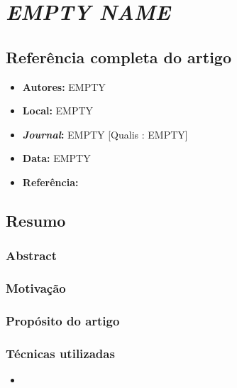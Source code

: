 \section{\textit{EMPTY NAME}}

\subsection{Referência completa do artigo}

\begin{itemize}
  \item \textbf{Autores:} EMPTY
  \item \textbf{Local:} EMPTY
  \item \textbf{\textit{Journal}:} EMPTY [Qualis : EMPTY]
  \item \textbf{Data:} EMPTY
  \item \textbf{Referência:} 
\end{itemize}


\subsection{Resumo}

\subsubsection{Abstract}

\subsubsection{Motivação}

\subsubsection{Propósito do artigo}

\subsubsection{Técnicas utilizadas} 
\begin{itemize}
  \item 
\end{itemize}  

